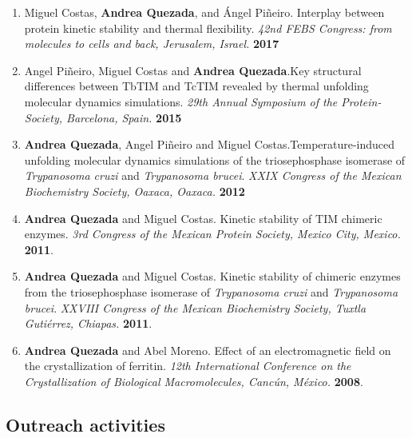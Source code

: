\documentclass[letterpaper,11pt]{article}
\begin{document}
\begin{enumerate}
\item Miguel Costas, \textbf{Andrea Quezada}, and Ángel Piñeiro. Interplay between protein kinetic stability and thermal flexibility. \emph{42nd FEBS Congress: from molecules to cells and back, Jerusalem, Israel.} \textbf{2017}  %
\item Angel Piñeiro, Miguel Costas and \textbf{Andrea Quezada}.Key structural differences between TbTIM and TcTIM revealed by thermal unfolding molecular dynamics simulations. \emph{29th Annual Symposium of the Protein-Society, Barcelona, Spain.} \textbf{2015} %
\item \textbf{Andrea Quezada}, Angel Piñeiro and Miguel Costas.Temperature-induced unfolding molecular dynamics simulations of the triosephosphase isomerase of \textit{Trypanosoma cruzi} and \textit{Trypanosoma brucei}. \emph{XXIX Congress of the Mexican Biochemistry Society, Oaxaca, Oaxaca.} \textbf{2012} %
\item \textbf {Andrea Quezada} and Miguel Costas. Kinetic stability of TIM chimeric enzymes. \emph{3rd Congress of the Mexican Protein Society, Mexico City, Mexico.} \textbf{2011}.
\item \textbf{Andrea Quezada} and Miguel Costas. Kinetic stability of chimeric enzymes from the triosephosphase isomerase of \textit{Trypanosoma cruzi} and \textit{Trypanosoma brucei}. \emph{XXVIII Congress of the Mexican Biochemistry Society, Tuxtla Gutiérrez, Chiapas.} \textbf{2011}. %
\item \textbf{Andrea Quezada} and Abel Moreno. Effect of an electromagnetic field on the crystallization of ferritin. \emph{12th International Conference on the Crystallization of Biological Macromolecules, Cancún, México.} \textbf{2008}. %
\end{enumerate}


\subsection*{Outreach activities}
\end{document}
